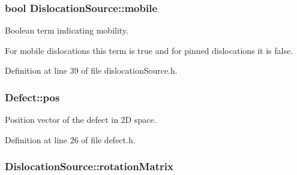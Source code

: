 \hypertarget{classDislocationSource_a7cfb4fd64ac4da8c79398b6e2c732875}{
\subsubsection[{mobile}]{\setlength{\rightskip}{0pt plus 5cm}bool {\bf \-Dislocation\-Source\-::mobile}}}\label{de/de3/classDislocationSource_a7cfb4fd64ac4da8c79398b6e2c732875}


\-Boolean term indicating mobility. 

\-For mobile dislocations this term is true and for pinned dislocations it is false. 

\-Definition at line 39 of file dislocation\-Source.\-h.

\hypertarget{classDefect_aed2731c1beefc22e3db6ad5b18194cdd}{
\subsubsection[{pos}]{ {\bf \-Defect\-::pos}}}\label{d5/d4f/classDefect_aed2731c1beefc22e3db6ad5b18194cdd}


\-Position vector of the defect in 2\-D space. 



\-Definition at line 26 of file defect.\-h.

\hypertarget{classDislocationSource_a3bb826a0646d5c5546045cbf8d523b4f}{
\subsubsection[{rotation\-Matrix}]{ {\bf \-Dislocation\-Source\-::rotation\-Matrix}}}\label{de/de3/classDislocationSource_a3bb826a0646d5c5546045cbf8d523b4f}


